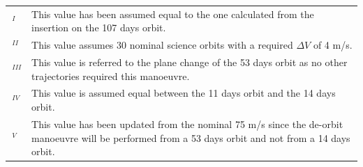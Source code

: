 {
\small
\renewcommand{\arraystretch}{1.1}
\begin{tabularx}{\linewidth}{lX}
    $\,^{I}$ & This value has been assumed equal to the one calculated from the insertion on the 107 days orbit. 
    \\
    $\,^{II}$ & This value assumes 30 nominal science orbits with a required $\Delta V$ of 4 m/s.
    \\
    $\,^{III}$ & This value is referred to the plane change of the 53 days orbit as no other trajectories required this manoeuvre. 
    \\
    $\,^{IV}$ & This value is assumed equal between the 11 days orbit and the 14 days orbit.
    \\
    $\,^{V}$ & This value has been updated from the nominal 75 m/s since the de-orbit manoeuvre will be performed from a 53 days orbit and not from a 14 days orbit.
\end{tabularx}
}